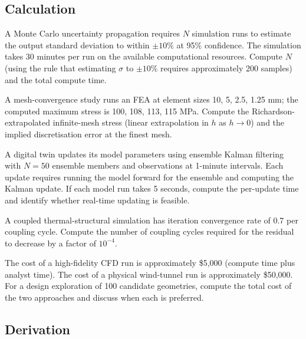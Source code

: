 \subsection*{Calculation}

\begin{exercise}
A Monte Carlo uncertainty propagation requires $N$ simulation runs to estimate the output standard deviation to within $\pm 10\%$ at 95\% confidence. The simulation takes 30 minutes per run on the available computational resources. Compute $N$ (using the rule that estimating $\sigma$ to $\pm 10\%$ requires approximately 200 samples) and the total compute time.
\end{exercise}

\begin{exercise}
A mesh-convergence study runs an FEA at element sizes 10, 5, 2.5, 1.25 mm; the computed maximum stress is 100, 108, 113, 115 MPa. Compute the Richardson-extrapolated infinite-mesh stress (linear extrapolation in $h$ as $h \to 0$) and the implied discretisation error at the finest mesh.
\end{exercise}

\begin{exercise}
A digital twin updates its model parameters using ensemble Kalman filtering with $N = 50$ ensemble members and observations at 1-minute intervals. Each update requires running the model forward for the ensemble and computing the Kalman update. If each model run takes 5 seconds, compute the per-update time and identify whether real-time updating is feasible.
\end{exercise}

\begin{exercise}
A coupled thermal-structural simulation has iteration convergence rate of 0.7 per coupling cycle. Compute the number of coupling cycles required for the residual to decrease by a factor of $10^{-4}$.
\end{exercise}

\begin{exercise}
The cost of a high-fidelity CFD run is approximately \$5{,}000 (compute time plus analyst time). The cost of a physical wind-tunnel run is approximately \$50{,}000. For a design exploration of 100 candidate geometries, compute the total cost of the two approaches and discuss when each is preferred.
\end{exercise}

\subsection*{Derivation}

